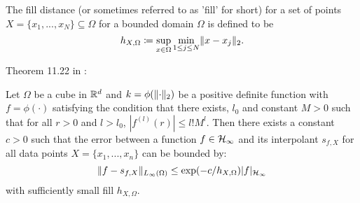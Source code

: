 \documentclass[twoside]{memoir}
\begin{document}
\begin{defn}
	The fill distance (or sometimes referred to as 'fill' for short) for a set of points $X = \{x_1, ..., x_N\} \subseteq \Omega$ for a bounded domain $\Omega$ is defined to be
	\[
	h_{X,\Omega} \coloneqq \sup_{x \in \Omega}\min_{1 \leq j \leq N} \lVert x- x_j\rVert_2.
	\]
\end{defn}

Theorem 11.22 in \cite{ScatteredDataApproximation}:
\begin{thm} \label{thm:interpolate}
	Let $\Omega$ be a cube in $\mathbb{R}^d$ and $k = \phi(\lVert\cdot\rVert_2)$ be a positive definite function with $f = \phi(\cdot)$ satisfying the condition that there exists, $l_0$ and constant $M > 0$ such that for all $r > 0$ and $l > l_0$, $|f^{(l)}(r)| \leq l!M^l$. Then there exists a constant $c > 0$ such that the error between a function $f \in \mathcal{H}_\infty$ and its interpolant $s_{f,X}$ for all data points $X = \{x_1, ..., x_n\}$ can be bounded by:
	\begin{equation*}
	\lVert f - s_{f,X}\rVert_{L_\infty(\Omega)} \leq \text{exp}(-c/h_{X,\Omega})|f|_{\mathcal{H}_\infty}
	\end{equation*}
	with sufficiently small fill $h_{X,\Omega}$.
\end{thm}
\end{document}
